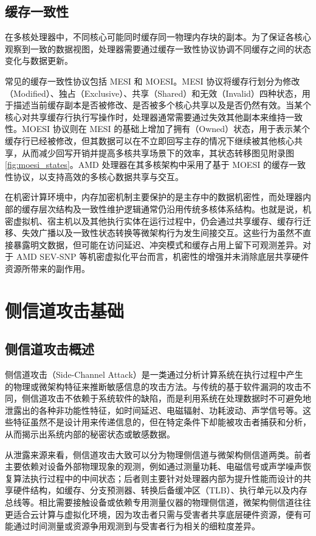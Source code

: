 \subsection{缓存一致性}

在多核处理器中，不同核心可能同时缓存同一物理内存块的副本。为了保证各核心观察到一致的数据视图，处理器需要通过缓存一致性协议协调不同缓存之间的状态变化与数据更新。

常见的缓存一致性协议包括 MESI 和 MOESI。MESI 协议将缓存行划分为修改（Modified）、独占（Exclusive）、共享（Shared）和无效（Invalid）四种状态，用于描述当前缓存副本是否被修改、是否被多个核心共享以及是否仍然有效。当某个核心对共享缓存行执行写操作时，处理器通常需要通过失效其他副本来维持一致性。MOESI 协议则在 MESI 的基础上增加了拥有（Owned）状态，用于表示某个缓存行已经被修改，但其数据可以在不立即回写主存的情况下继续被其他核心共享，从而减少回写开销并提高多核共享场景下的效率\cite{amd64manual}，其状态转移图见附录图\ref{fig:moesi_states}。AMD 处理器在其多核架构中采用了基于 MOESI 的缓存一致性协议，以支持高效的多核心数据共享与交互\cite{amd64manual}。

在机密计算环境中，内存加密机制主要保护的是主存中的数据机密性，而处理器内部的缓存层次结构及一致性维护逻辑通常仍沿用传统多核体系结构。也就是说，机密虚拟机、宿主机以及其他执行实体在运行过程中，仍会通过共享缓存、缓存行迁移、失效广播以及一致性状态转换等微架构行为发生间接交互\cite{lou2022survey,ge2018survey}。这些行为虽然不直接暴露明文数据，但可能在访问延迟、冲突模式和缓存占用上留下可观测差异。对于 AMD SEV-SNP 等机密虚拟化平台而言，机密性的增强并未消除底层共享硬件资源所带来的副作用。

\section{侧信道攻击基础}

\subsection{侧信道攻击概述}
侧信道攻击（Side-Channel Attack）是一类通过分析计算系统在执行过程中产生的物理或微架构特征来推断敏感信息的攻击方法。与传统的基于软件漏洞的攻击不同，侧信道攻击不依赖于系统软件的缺陷，而是利用系统在处理数据时不可避免地泄露出的各种非功能性特征，如时间延迟、电磁辐射、功耗波动、声学信号等\cite{kocher1996timing,kocher1999differential}。这些特征虽然不是设计用来传递信息的，但在特定条件下却能被攻击者捕获和分析，从而揭示出系统内部的秘密状态或敏感数据。

从泄露来源来看，侧信道攻击大致可以分为物理侧信道与微架构侧信道两类。前者主要依赖对设备外部物理现象的观测，例如通过测量功耗、电磁信号或声学噪声恢复算法执行过程中的中间状态；后者则主要针对处理器内部为提升性能而设计的共享硬件结构，如缓存、分支预测器、转换后备缓冲区（TLB）、执行单元以及内存总线等\cite{ge2018survey,lou2022survey}。相比需要接触设备或依赖专用测量仪器的物理侧信道，微架构侧信道往往更适合云计算与虚拟化环境，因为攻击者只需与受害者共享底层硬件资源，便有可能通过时间测量或资源争用观测到与受害者行为相关的细粒度差异。

